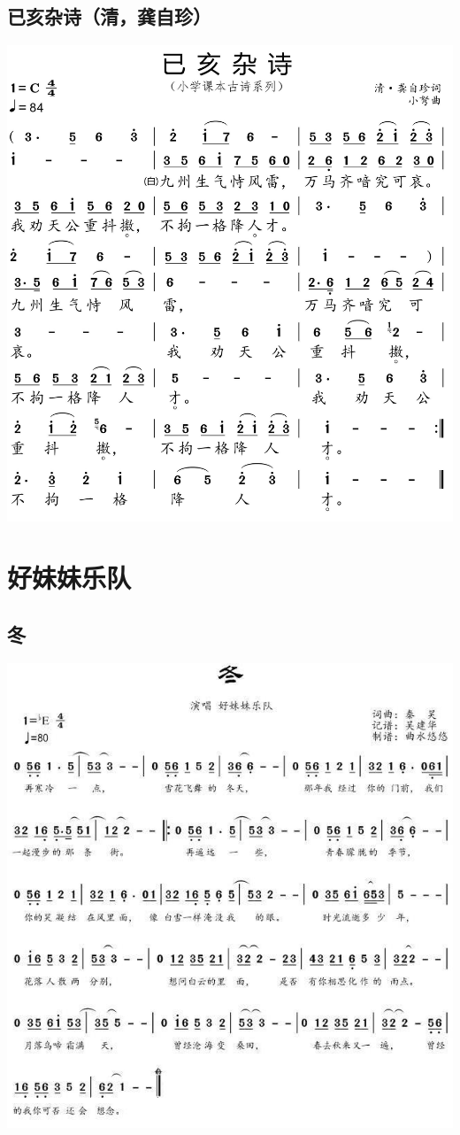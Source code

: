 \documentclass[cn,pad,chinesefont=nofont]{elegantbook}
\begin{document}
\section{已亥杂诗（清，龚自珍）}
    \includegraphics[width=\textwidth]{dongxiao/20200627-古诗-龚自珍-已亥杂诗.jpg}   
        
\chapter{好妹妹乐队}
\section{冬}
    \includegraphics[width=\textwidth]{dongxiao/20200516-好妹妹-冬.jpg} 
\end{document}
